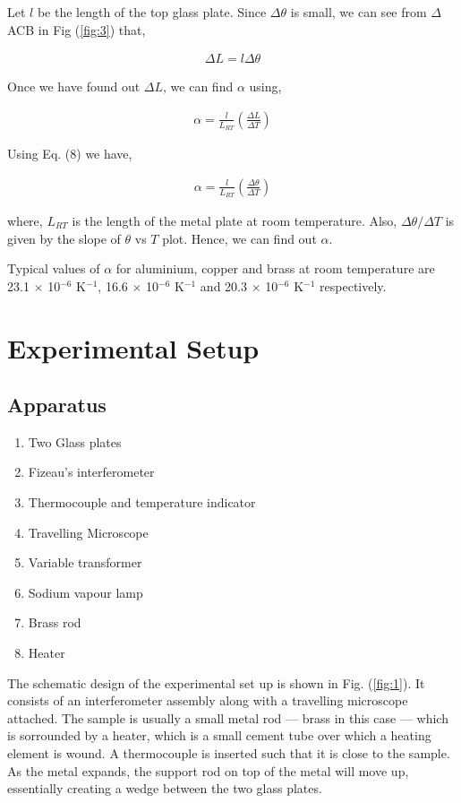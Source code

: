 Let $l$ be the length of the top glass plate. Since $\Delta \theta$ is small,
we can see from $\Delta$ACB in Fig (\ref{fig:3}) that,

\begin{align}
    \Delta L = l \Delta \theta
\end{align}

Once we have found out $\Delta L$, we can find $\alpha$ using,

\begin{align}
    \alpha = \frac{l}{L_{RT}} \left(\frac{\Delta L}{\Delta T}\right)
\end{align}

Using Eq. (8) we have,

\begin{align}
    \alpha = \frac{l}{L_{RT}} \left(\frac{\Delta \theta}{\Delta T}\right)
\end{align}

where, $L_{RT}$ is the length of the metal plate at room temperature. Also, $\Delta \theta/\Delta T$ is given by the slope of $\theta$ vs $T$ plot. Hence, we can find out $\alpha$.

Typical values of $\alpha$ for aluminium, copper and brass at room
temperature are 23.1 $\times$ 10$^{-6}$ K$^{-1}$, 16.6 $\times$ 10$^{-6}$ K$^{-1}$ and 20.3
$\times$ 10$^{-6}$ K$^{-1}$ respectively.

\section{Experimental Setup}

\subsection*{Apparatus}

\begin{enumerate}
    \item Two Glass plates
    \item Fizeau's interferometer
    \item Thermocouple and temperature indicator
    \item Travelling Microscope
    \item Variable transformer
    \item Sodium vapour lamp
    \item Brass rod
    \item Heater\\
\end{enumerate}

The schematic design of the experimental set up is shown in Fig. (\ref{fig:1}). It consists of an
interferometer assembly along with a travelling microscope attached. The sample is usually a small metal rod --- brass in this case --- which is sorrounded by a heater, which is a small cement tube over
which a heating element is wound. A thermocouple is inserted such that it is
close to the sample. As the metal expands, the support rod on top of the metal will move up, essentially
creating a wedge between the two glass plates.